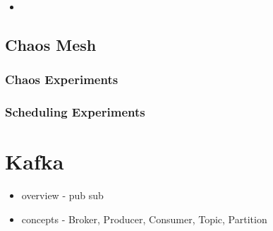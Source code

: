\begin{itemize}
	\item 
\end{itemize}

\subsection{Chaos Mesh} \label{background-chaos-mesh}

\subsubsection{Chaos Experiments}

\subsubsection{Scheduling Experiments}

\section{Kafka} \label{background-kafka}

\begin{itemize}
	\item overview - pub sub
	\item concepts - Broker, Producer, Consumer, Topic, Partition
\end{itemize}

